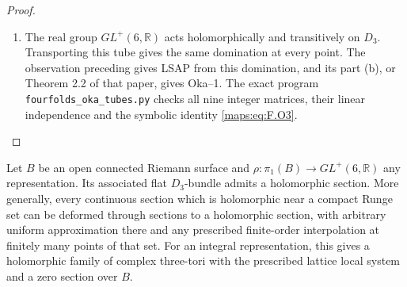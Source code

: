 \begin{proof}
\begin{enumerate}[label={$\langle1\rangle$\arabic*.}]
\item The real group $GL^+(6,\mathbb R)$ acts holomorphically and
transitively on $D_3$.  Transporting this tube gives the same
domination at every point.  The observation preceding
\cite[Proposition 7.13 and preceding paragraph, pp.~23--24]{IVVOkaOneV5} gives LSAP from
this domination, and its part (b), or Theorem 2.2 of that paper,
gives Oka--1.  The exact program
\texttt{fourfolds\_oka\_tubes.py} checks all nine integer
matrices, their linear independence and the symbolic identity
\eqref{maps:eq:F.O3}.

\end{enumerate}
\end{proof}




\begin{theorem}\hypertarget{tag-02OB}{}\label{maps:src:F.3.9}


Let $B$ be an open connected Riemann surface and
$\rho:\pi_1(B)\to GL^+(6,\mathbb R)$ any representation.
Its associated flat $D_3$-bundle admits a holomorphic section.
More generally, every continuous section which is holomorphic
near a compact Runge set can be deformed through sections to a
holomorphic section, with arbitrary uniform approximation there
and any prescribed finite-order interpolation at finitely many
points of that set.  For an integral representation, this gives
a holomorphic family of complex three-tori with the prescribed
lattice local system and a zero section over $B$.

\end{theorem}



